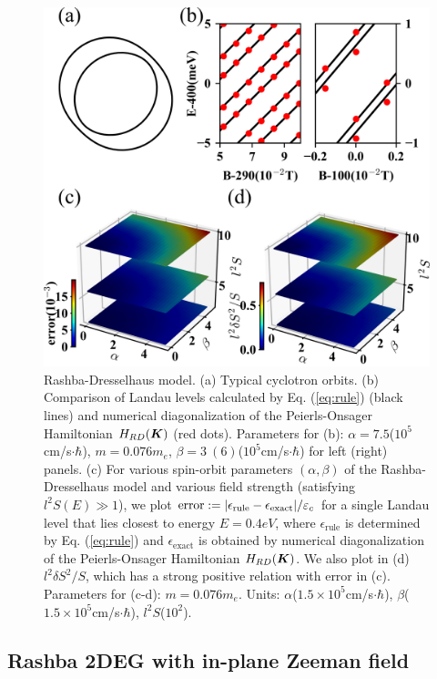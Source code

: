 \documentclass[aps, prb, showpacs, twocolumn, notitlepage, superscriptaddress]{revtex4-1}
\begin{document}
\begin{figure}
\includegraphics[width=1.0\columnwidth]{RD.png}
\caption{Rashba-Dresselhaus model. (a) Typical cyclotron orbits. (b) Comparison of Landau levels calculated by Eq. (\ref{eq:rule}) (black lines) and numerical diagonalization of the Peierls-Onsager Hamiltonian  $H_{RD}(\boldsymbol{K})$ (red dots). Parameters for (b): $\alpha=7.5$($10^{5}$cm/s$\cdot\hbar$), $m=0.076m_e$, $\beta=3~(6)$($10^{5}$cm/s$\cdot\hbar$) for left (right) panels. (c) For various spin-orbit parameters $(\alpha,\beta)$ of the Rashba-Dresselhaus model and various field strength (satisfying $l^2S(E)\gg 1$), we plot  $\text{error}:=|\epsilon_\text{rule}-\epsilon_\text{exact}|/\varepsilon_c$ for a single Landau level that lies closest to energy $E=0.4eV$, where $\epsilon_\text{rule}$ is determined by Eq. (\ref{eq:rule}) and $\epsilon_{\text{exact}}$ is obtained by numerical diagonalization of the Peierls-Onsager Hamiltonian  $H_{RD}(\boldsymbol{K})$. We also plot in (d) $l^2\delta S^2/S$, which has a strong positive relation with error in (c). Parameters for (c-d): $m=0.076m_e$. Units: $\alpha$($1.5\times 10^{5}$cm/s$\cdot\hbar$), $\beta$($1.5\times 10^{5}$cm/s$\cdot\hbar$), $l^2 S$($10^2$).\label{fig:RD}}
\end{figure}

\subsection{Rashba 2DEG with in-plane Zeeman field}
\end{document}

